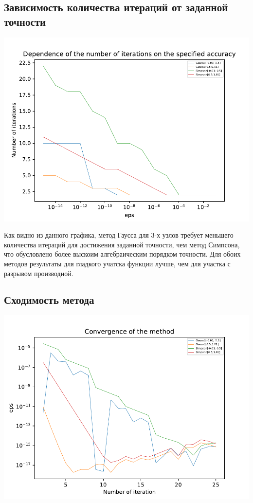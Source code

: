 \subsection{Зависимость количества итераций от заданной точности}

\includegraphics[scale=0.75]{1.pdf}

Как видно из данного графика, метод Гаусса для 3-х узлов требует меньшего количества итераций для достижения заданной точности, чем метод Симпсона, что обусловлено более выскоим алгебраическим порядком точности. Для обоих методов результаты для гладкого учатска функции лучше, чем для участка с разрывом производной. 

\subsection{Сходимость метода}

\includegraphics[scale=0.75]{2.pdf}

